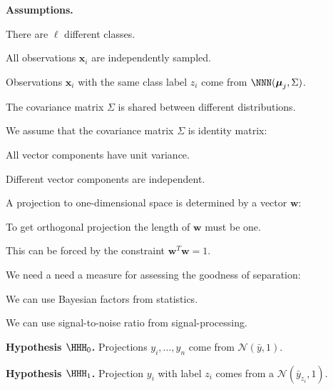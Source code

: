 \documentclass[landscape,footrule]{foils}
\renewcommand{\vec}[1]{\boldsymbol{#1}}
\begin{document}
\textbf{Assumptions.}
\begin{triangles}
\item There are $\ell$ different classes. 
\item All observations $\vec{x}_i$ are independently sampled.
\item Observations $\vec{x}_i$ with the same class label $z_i$ come from $\NNN(\vec{\mu}_j, \Sigma)$.
\item The covariance matrix $\Sigma$ is shared between different distributions.
\end{triangles}



We assume that the covariance matrix $\Sigma$ is identity matrix: 
\begin{triangles}
\item All vector components have unit variance. 
\item Different vector components are independent.
\end{triangles}



A projection to one-dimensional space is determined by a vector $\vec{w}$:
\begin{triangles}
\item To get orthogonal projection the length of $\vec{w}$ must be one.
\item This can be forced by the constraint $\vec{w}^T\vec{w}=1$.  
\end{triangles}



We need a need a  measure for assessing the goodness of separation: 
\begin{triangles}
\item We can use Bayesian factors from statistics.
\item We can use signal-to-noise ratio from signal-processing.
\end{triangles}


\begin{triangles}
\item \textbf{Hypothesis $\HHH_0$.} Projections $y_i,\ldots, y_n$ come from $\mathcal{N}(\bar{y}, 1)$.
\item \textbf{Hypothesis $\HHH_1$.} Projection $y_i$ with label $z_i$ comes from a $\mathcal{N}(\bar{y}_{z_i},1)$.\vspace*{2ex}
\end{triangles}
\end{document}
